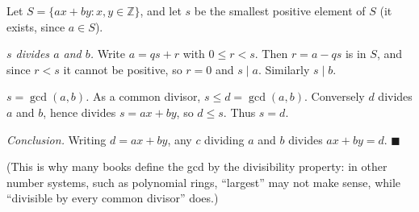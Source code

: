 Let $S=\{ax+by: x,y\in\mathbb Z\}$, and let $s$ be the smallest positive element of $S$ (it exists, since $a\in S$).

\emph{$s$ divides $a$ and $b$.} Write $a=qs+r$ with $0\le r<s$. Then $r=a-qs$ is in $S$, and since $r<s$ it cannot be positive, so $r=0$ and $s\mid a$. Similarly $s\mid b$.

\emph{$s=\gcd(a,b)$.} As a common divisor, $s\le d=\gcd(a,b)$. Conversely $d$ divides $a$ and $b$, hence divides $s=ax+by$, so $d\le s$. Thus $s=d$.

\emph{Conclusion.} Writing $d=ax+by$, any $c$ dividing $a$ and $b$ divides $ax+by=d$. $\blacksquare$

(This is why many books define the gcd by the divisibility property: in other number systems, such as polynomial rings, ``largest'' may not make sense, while ``divisible by every common divisor'' does.)
